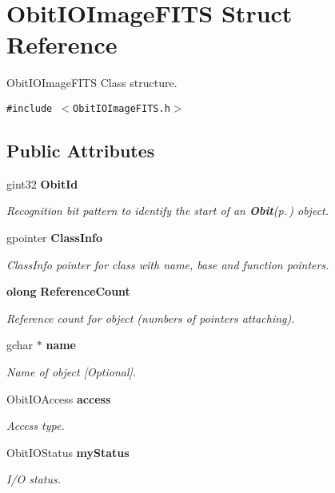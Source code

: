 \section{Obit\-IOImage\-FITS Struct Reference}
\label{structObitIOImageFITS}
Obit\-IOImage\-FITS Class structure.  


{\tt \#include $<$Obit\-IOImage\-FITS.h$>$}

\subsection*{Public Attributes}
\begin{CompactItemize}
\item 
gint32 {\bf Obit\-Id}
\begin{CompactList}\small\item\em Recognition bit pattern to identify the start of an {\bf Obit}{\rm (p.\,\pageref{structObit})} object. \item\end{CompactList}\item 
gpointer {\bf Class\-Info}
\begin{CompactList}\small\item\em Class\-Info pointer for class with name, base and function pointers. \item\end{CompactList}\item 
{\bf olong} {\bf Reference\-Count}
\begin{CompactList}\small\item\em Reference count for object (numbers of pointers attaching). \item\end{CompactList}\item 
gchar $\ast$ {\bf name}
\begin{CompactList}\small\item\em Name of object [Optional]. \item\end{CompactList}\item 
Obit\-IOAccess {\bf access}
\begin{CompactList}\small\item\em Access type. \item\end{CompactList}\item 
Obit\-IOStatus {\bf my\-Status}
\begin{CompactList}\small\item\em I/O status. \item\end{CompactList}\item 

\end{CompactItemize}

